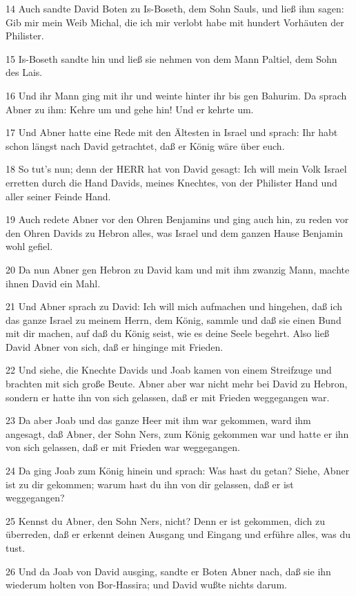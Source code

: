 \par 14 Auch sandte David Boten zu Is-Boseth, dem Sohn Sauls, und ließ ihm sagen: Gib mir mein Weib Michal, die ich mir verlobt habe mit hundert Vorhäuten der Philister.
\par 15 Is-Boseth sandte hin und ließ sie nehmen von dem Mann Paltiel, dem Sohn des Lais.
\par 16 Und ihr Mann ging mit ihr und weinte hinter ihr bis gen Bahurim. Da sprach Abner zu ihm: Kehre um und gehe hin! Und er kehrte um.
\par 17 Und Abner hatte eine Rede mit den Ältesten in Israel und sprach: Ihr habt schon längst nach David getrachtet, daß er König wäre über euch.
\par 18 So tut's nun; denn der HERR hat von David gesagt: Ich will mein Volk Israel erretten durch die Hand Davids, meines Knechtes, von der Philister Hand und aller seiner Feinde Hand.
\par 19 Auch redete Abner vor den Ohren Benjamins und ging auch hin, zu reden vor den Ohren Davids zu Hebron alles, was Israel und dem ganzen Hause Benjamin wohl gefiel.
\par 20 Da nun Abner gen Hebron zu David kam und mit ihm zwanzig Mann, machte ihnen David ein Mahl.
\par 21 Und Abner sprach zu David: Ich will mich aufmachen und hingehen, daß ich das ganze Israel zu meinem Herrn, dem König, sammle und daß sie einen Bund mit dir machen, auf daß du König seist, wie es deine Seele begehrt. Also ließ David Abner von sich, daß er hinginge mit Frieden.
\par 22 Und siehe, die Knechte Davids und Joab kamen von einem Streifzuge und brachten mit sich große Beute. Abner aber war nicht mehr bei David zu Hebron, sondern er hatte ihn von sich gelassen, daß er mit Frieden weggegangen war.
\par 23 Da aber Joab und das ganze Heer mit ihm war gekommen, ward ihm angesagt, daß Abner, der Sohn Ners, zum König gekommen war und hatte er ihn von sich gelassen, daß er mit Frieden war weggegangen.
\par 24 Da ging Joab zum König hinein und sprach: Was hast du getan? Siehe, Abner ist zu dir gekommen; warum hast du ihn von dir gelassen, daß er ist weggegangen?
\par 25 Kennst du Abner, den Sohn Ners, nicht? Denn er ist gekommen, dich zu überreden, daß er erkennt deinen Ausgang und Eingang und erführe alles, was du tust.
\par 26 Und da Joab von David ausging, sandte er Boten Abner nach, daß sie ihn wiederum holten von Bor-Hassira; und David wußte nichts darum.
